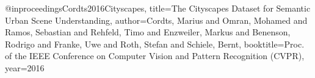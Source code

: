 @inproceedings{Cordts2016Cityscapes,
title={The Cityscapes Dataset for Semantic Urban Scene Understanding},
author={Cordts, Marius and Omran, Mohamed and Ramos, Sebastian and Rehfeld, Timo and Enzweiler, Markus and Benenson, Rodrigo and Franke, Uwe and Roth, Stefan and Schiele, Bernt},
booktitle={Proc. of the IEEE Conference on Computer Vision and Pattern Recognition (CVPR)},
year={2016}
}
